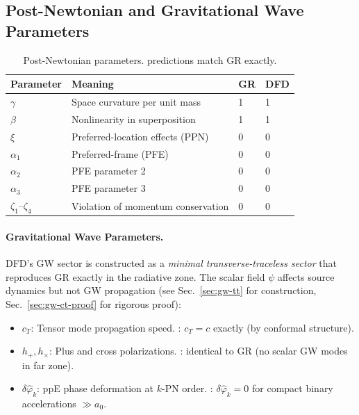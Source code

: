 \subsection{Post-Newtonian and Gravitational Wave Parameters}\label{app:ppn}

\begin{table}[h!]
\centering
\caption{Post-Newtonian parameters. \DFD predictions match GR exactly.}
\label{tab:ppn}
\begin{tabular}{llll}
\toprule
\textbf{Parameter} & \textbf{Meaning} & \textbf{GR} & \textbf{DFD} \\
\midrule
$\gamma$ & Space curvature per unit mass & 1 & 1 \\
$\beta$ & Nonlinearity in superposition & 1 & 1 \\
$\xi$ & Preferred-location effects (PPN) & 0 & 0 \\
$\alpha_1$ & Preferred-frame (PFE) & 0 & 0 \\
$\alpha_2$ & PFE parameter 2 & 0 & 0 \\
$\alpha_3$ & PFE parameter 3 & 0 & 0 \\
$\zeta_1$--$\zeta_4$ & Violation of momentum conservation & 0 & 0 \\
\bottomrule
\end{tabular}
\end{table}

\paragraph{Gravitational Wave Parameters.}
DFD's GW sector is constructed as a \textit{minimal transverse-traceless sector} that reproduces GR exactly in the radiative zone. The scalar field $\psi$ affects source dynamics but not GW propagation (see Sec.~\ref{sec:gw-tt} for construction, Sec.~\ref{sec:gw-ct-proof} for rigorous proof):
\begin{itemize}
\item $c_T$: Tensor mode propagation speed. \DFD: $c_T = c$ exactly (by conformal structure).
\item $h_{+}, h_{\times}$: Plus and cross polarizations. \DFD: identical to GR (no scalar GW modes in far zone).
\item $\delta\hat{\varphi}_k$: ppE phase deformation at $k$-PN order. \DFD: $\delta\hat{\varphi}_k = 0$ for compact binary accelerations $\gg a_0$.
\end{itemize}

